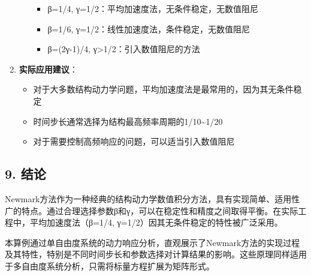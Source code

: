 \documentclass[11pt]{article}
\providecommand{\tightlist}{%
      \setlength{\itemsep}{0pt}\setlength{\parskip}{0pt}}
\begin{document}
\begin{enumerate}
\begin{itemize}
    \begin{itemize}
    \tightlist
    \item
      β=1/4, γ=1/2：平均加速度法，无条件稳定，无数值阻尼
    \item
      β=1/6, γ=1/2：线性加速度法，条件稳定，无数值阻尼
    \item
      β=(2γ-1)/4, γ\textgreater1/2：引入数值阻尼的方法
    \end{itemize}
  \end{itemize}
\item
  \textbf{实际应用建议}：

  \begin{itemize}
  \tightlist
  \item
    对于大多数结构动力学问题，平均加速度法是最常用的，因为其无条件稳定
  \item
    时间步长通常选择为结构最高频率周期的1/10\textasciitilde1/20
  \item
    对于需要控制高频响应的问题，可以适当引入数值阻尼
  \end{itemize}
\end{enumerate}

    \subsection{9. 结论}\label{ux7ed3ux8bba}

Newmark方法作为一种经典的结构动力学数值积分方法，具有实现简单、适用性广的特点。通过合理选择参数β和γ，可以在稳定性和精度之间取得平衡。在实际工程中，平均加速度法（β=1/4,
γ=1/2）因其无条件稳定的特性被广泛采用。

本算例通过单自由度系统的动力响应分析，直观展示了Newmark方法的实现过程及其特性，特别是不同时间步长和参数选择对计算结果的影响。这些原理同样适用于多自由度系统分析，只需将标量方程扩展为矩阵形式。


    
    
    
\end{document}
